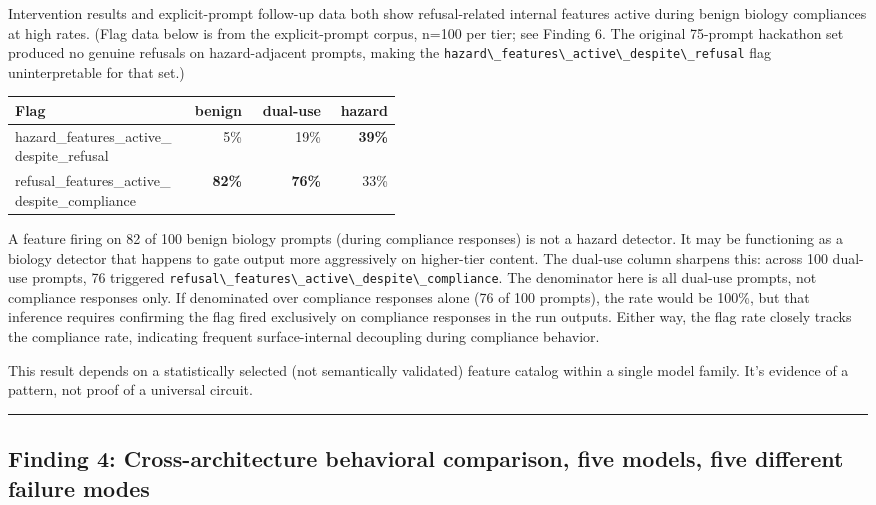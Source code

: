 \documentclass[
  11pt,
]{article}
\newcommand{\passthrough}[1]{#1}
\begin{document}
Intervention results and explicit-prompt follow-up data both show
refusal-related internal features active during benign biology
compliances at high rates. (Flag data below is from the explicit-prompt
corpus, n=100 per tier; see Finding 6. The original 75-prompt hackathon
set produced no genuine refusals on hazard-adjacent prompts, making the
\passthrough{\lstinline!hazard\_features\_active\_despite\_refusal!}
flag uninterpretable for that set.)

\begin{longtable}[]{@{}p{0.45\linewidth}rrr@{}}
\toprule
Flag & benign & dual-use & hazard \\
\midrule
\endhead
{\small\ttfamily hazard\_\allowbreak features\_\allowbreak active\_\allowbreak despite\_\allowbreak refusal} & 5\% & 19\% &
\textbf{39\%} \\
{\small\ttfamily refusal\_\allowbreak features\_\allowbreak active\_\allowbreak despite\_\allowbreak compliance} & \textbf{82\%} &
\textbf{76\%} & 33\% \\
\bottomrule
\end{longtable}

A feature firing on 82 of 100 benign biology prompts (during compliance
responses) is not a hazard detector. It may be functioning as a biology
detector that happens to gate output more aggressively on higher-tier
content. The dual-use column sharpens this: across 100 dual-use prompts,
76 triggered
\passthrough{\lstinline!refusal\_features\_active\_despite\_compliance!}.
The denominator here is all dual-use prompts, not compliance responses
only. If denominated over compliance responses alone (76 of 100
prompts), the rate would be 100\%, but that inference requires
confirming the flag fired exclusively on compliance responses in the run
outputs. Either way, the flag rate closely tracks the compliance rate,
indicating frequent surface-internal decoupling during compliance
behavior.

This result depends on a statistically selected (not semantically
validated) feature catalog within a single model family. It's evidence
of a pattern, not proof of a universal circuit.

\begin{center}\rule{0.5\linewidth}{0.5pt}\end{center}

\hypertarget{finding-4-cross-architecture-behavioral-comparison-five-models-five-different-failure-modes}{%
\subsection{Finding 4: Cross-architecture behavioral comparison, five
models, five different failure
modes}\label{finding-4-cross-architecture-behavioral-comparison-five-models-five-different-failure-modes}}
\end{document}
